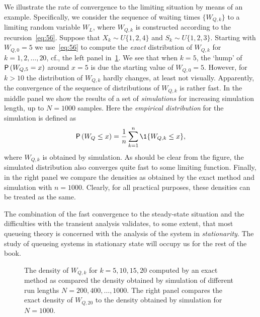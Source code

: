 We illustrate the rate of convergence to the limiting situation by means of an example.
Specifically, we consider the sequence of waiting times $\{W_{Q,k}\}$ to a limiting random variable $W_L$, where $W_{Q,k}$ is constructed according to the recursion~\cref{eq:56}.
Suppose that $X_k\sim U\{1,2,4\}$ and $S_k\sim U\{1,2,3\}$.
Starting with $W_{Q,0}=5$ we use~\cref{eq:56} to compute the \emph{exact} distribution of $W_{Q,k}$ for $k=1,2,\ldots, 20$, cf., the left panel in~\cref{fig:convergence}.
We see that when $k=5$, the `hump' of $\P{W_{Q,5}=x}$ around $x=5$ is due the starting value of $W_{Q,0}=5$.
However, for $k>10$ the distribution of $W_{Q,k}$ hardly changes, at least not visually.
Apparently, the convergence of the sequence of distributions of $W_{Q,k}$ is rather fast.
In the middle panel we show the results of a set of \emph{simulations} for increasing simulation length, up to $N=1000$ samples.
Here the \emph{empirical distribution} for the simulation is defined as
\begin{equation*}
\P{W_Q\leq x} =   \frac 1n \sum_{k=1}^n \1{W_{Q,k} \leq x},
\end{equation*}
where $W_{Q,k}$ is obtained by simulation.
As should be clear from the figure, the simulated distribution also converges quite fast to some limiting function.
Finally, in the right panel we compare the densities as obtained by the exact method and simulation with $n=1000$.
Clearly, for all practical purposes, these densities can be treated as the same.

The combination of the fast convergence to the steady-state situation
and the difficulties with the transient analysis validates, to some
extent, that most queueing theory is concerned with the analysis of
the system in \emph{stationarity}. The study of queueing systems in
stationary state will occupy us for the rest of the book.

\begin{figure}
  \centering



  \caption{The density of $W_{Q,k}$ for $k=5, 10, 15, 20$ computed by
    an exact method as compared the density obtained by simulation of
    different run lengths $N=200, 400, \ldots, 1000$. The right panel
    compares the exact density of $W_{Q,20}$ to the density obtained by simulation
    for $N=1000$.}
\label{fig:convergence}
\end{figure}





